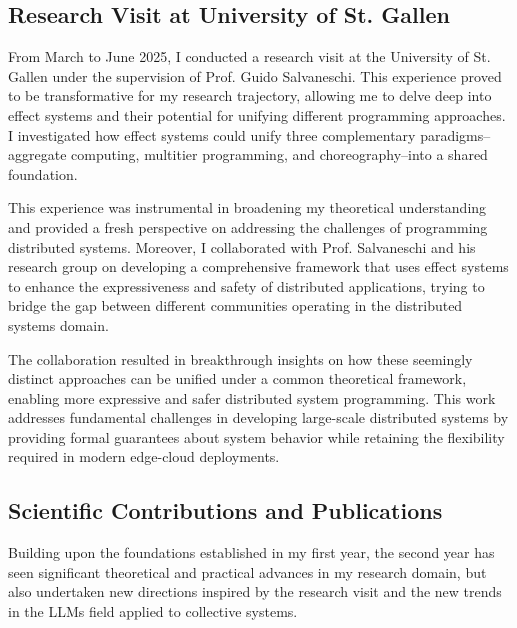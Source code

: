 \documentclass[runningheads]{llncs}
\begin{document}

\subsection{Research Visit at University of St. Gallen}

From March to June 2025,
I conducted a research visit at the University of St. Gallen under the supervision of Prof. Guido Salvaneschi.
%
This experience proved to be transformative for my research trajectory,
allowing me to delve deep into effect systems and their potential for unifying different programming approaches.
%
I investigated how effect systems could unify three complementary paradigms--aggregate computing,
multitier programming,
and choreography--into a shared foundation.

This experience was instrumental in broadening my theoretical understanding and provided a fresh perspective on addressing the challenges of programming distributed systems.
%
Moreover,
I collaborated with Prof. Salvaneschi and his research group on developing a comprehensive framework that uses effect systems to enhance the expressiveness and safety of distributed applications,
trying to bridge the gap between different communities operating in the distributed systems domain.

The collaboration resulted in breakthrough insights on how these seemingly distinct approaches can be unified under a common theoretical framework,
enabling more expressive and safer distributed system programming.
%
This work addresses fundamental challenges in developing large-scale distributed systems by providing formal guarantees about system behavior while retaining the flexibility required in modern edge-cloud deployments.

\subsection{Scientific Contributions and Publications}
Building upon the foundations established in my first year,
the second year has seen significant theoretical and practical advances in my research domain,
but also undertaken new directions inspired by the research visit and the new trends in the LLMs field applied to collective systems.
\end{document}
